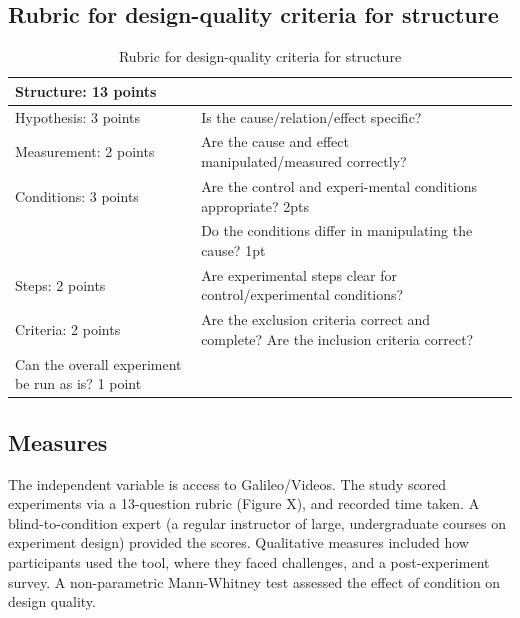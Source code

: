 \subsection{Rubric for design-quality criteria for structure }

\vspace{0.25in}
\begin{table}[!ht]
\caption[]{Rubric for design-quality criteria for structure}

\vspace{-0.25in}
\begin{center}
\begin{tabular}{|p{1in}|p{2in}|p{3in}|}

\hline
Structure: 13 points &  \\

\hline
Hypothesis: 3 points & Is the cause/relation/effect specific?  \\

\hline
Measurement: 2 points & Are the cause and effect manipulated/measured correctly? \\

\hline
Conditions: 3 points  & Are the control and experi-mental conditions appropriate? 2pts \\
 & Do the conditions differ in manipulating the cause? 1pt \\

\hline
Steps: 2 points  & Are experimental steps clear for control/experimental conditions?  \\

\hline
Criteria: 2 points & Are the exclusion criteria correct and complete? Are the inclusion criteria correct? \\

\hline
Can the overall experiment be run as is? 1 point \\

\hline
\end{tabular}
\end{center}
\label{tab:rubric1}
\end{table}


\subsection{Measures}
The independent variable is access to Galileo/Videos. The study scored experiments via a 13-question rubric (Figure X), and recorded time taken. A blind-to-condition expert (a regular instructor of large, undergraduate courses on experiment design) provided the scores. Qualitative measures included how participants used the tool, where they faced challenges, and a post-experiment survey. A non-parametric Mann-Whitney test assessed the effect of condition on design quality. 


